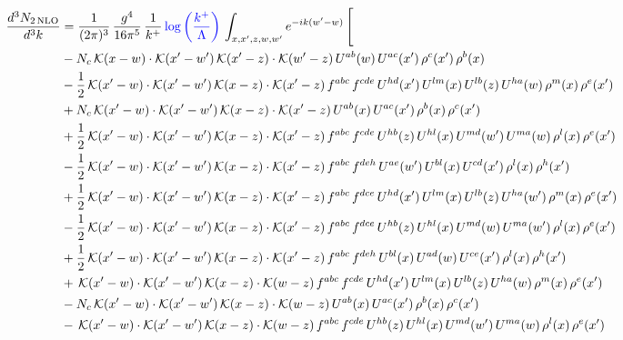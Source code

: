 \documentclass[9pt]{article}
\numberwithin{equation}{section}
\begin{document}
\begin{align}
\frac{d^{3}N_{2\,\mathrm{NLO}}}{d^{3}k} & = \frac{1}{(2\pi)^{3}}\,\frac{g^{4}}{16\pi^{5}}\,\frac{1}{k^{+}}\,{\color{blue}\log{\left(\frac{k^{+}}{\Lambda}\right)}}\,\int_{x,x',z,w,w'}e^{-ik(w'-w)}\,\Bigg[\notag\\ & -N_{c}\,\mathcal{K}(x-w)\cdot\mathcal{K}(x'-w')\,\mathcal{K}(x'-z)\cdot\mathcal{K}(w'-z)\,U^{ab}(w)\,U^{ac}(x')\,\rho^{c}(x')\,\rho^{b}(x)\notag\\
& -\frac{1}{2}\,\mathcal{K}(x'-w)\cdot\mathcal{K}(x'-w')\,\mathcal{K}(x-z)\cdot\mathcal{K}(x'-z)\,f^{abc}\,f^{cde}\,U^{hd}(x')\,U^{lm}(x)\,U^{lb}(z)\,U^{ha}(w)\,\rho^{m}(x)\,\rho^{e}(x')\notag\\
& +N_{c}\,\mathcal{K}(x'-w)\cdot\mathcal{K}(x'-w')\,\mathcal{K}(x-z)\cdot\mathcal{K}(x'-z)\,U^{ab}(x)\,U^{ac}(x')\,\rho^{b}(x)\,\rho^{c}(x')\notag\\
& +\frac{1}{2}\,\mathcal{K}(x'-w)\cdot\mathcal{K}(x'-w')\,\mathcal{K}(x-z)\cdot\mathcal{K}(x'-z)\,f^{abc}\,f^{cde}\,U^{hb}(z)\,U^{hl}(x)\,U^{md}(w')\,U^{ma}(w)\,\rho^{l}(x)\,\rho^{e}(x')\notag\\
& -\frac{1}{2}\,\mathcal{K}(x'-w)\cdot\mathcal{K}(x'-w')\,\mathcal{K}(x-z)\cdot\mathcal{K}(x'-z)\,f^{abc}\,f^{deh}\,U^{ae}(w')\,U^{bl}(x)\,U^{cd}(x')\,\rho^{l}(x)\,\rho^{h}(x')\notag \\ & +\frac{1}{2}\,\mathcal{K}(x'-w)\cdot\mathcal{K}(x'-w')\,\mathcal{K}(x-z)\cdot\mathcal{K}(x'-z)\,f^{abc}\,f^{dce}\,U^{hd}(x')\,U^{lm}(x)\,U^{lb}(z)\,U^{ha}(w')\,\rho^{m}(x)\,\rho^{e}(x')\notag\\
& -\frac{1}{2}\,\mathcal{K}(x'-w)\cdot\mathcal{K}(x'-w')\,\mathcal{K}(x-z)\cdot\mathcal{K}(x'-z)\,f^{abc}\,f^{dce}\,U^{hb}(z)\,U^{hl}(x)\,U^{md}(w)\,U^{ma}(w')\,\rho^{l}(x)\,\rho^{e}(x')\notag\\
& +\frac{1}{2}\,\mathcal{K}(x'-w)\cdot\mathcal{K}(x'-w')\,\mathcal{K}(x-z)\cdot\mathcal{K}(x'-z)\,f^{abc}\,f^{deh}\,U^{bl}(x)\,U^{ad}(w)\,U^{ce}(x')\,\rho^{l}(x)\,\rho^{h}(x')\notag\\
& +\,\mathcal{K}(x'-w)\cdot\mathcal{K}(x'-w')\,\mathcal{K}(x-z)\cdot\mathcal{K}(w-z)\,f^{abc}\,f^{cde}\,U^{hd}(x')\,U^{lm}(x)\,U^{lb}(z)\,U^{ha}(w)\,\rho^{m}(x)\,\rho^{e}(x')\notag\\
& -N_{c}\,\mathcal{K}(x'-w)\cdot\mathcal{K}(x'-w')\,\mathcal{K}(x-z)\cdot\mathcal{K}(w-z)\,U^{ab}(x)\,U^{ac}(x')\,\rho^{b}(x)\,\rho^{c}(x')\notag\\
& -\,\mathcal{K}(x'-w)\cdot\mathcal{K}(x'-w')\,\mathcal{K}(x-z)\cdot\mathcal{K}(w-z)\,f^{abc}\,f^{cde}\,U^{hb}(z)\,U^{hl}(x)\,U^{md}(w')\,U^{ma}(w)\,\rho^{l}(x)\,\rho^{e}(x')\notag\\

\end{align}
\end{document}
